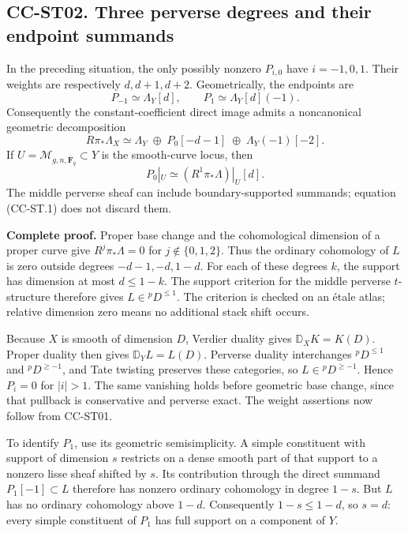 \subsection{CC-ST02. Three perverse degrees and their endpoint
summands}\label{cc-st02.-three-perverse-degrees-and-their-endpoint-summands}

In the preceding situation, the only possibly nonzero \(P_{i,0}\) have
\(i=-1,0,1\). Their weights are respectively \(d,d+1,d+2\).
Geometrically, the endpoints are \[
P_{-1}\simeq\Lambda_Y[d],\qquad
P_1\simeq\Lambda_Y[d](-1).
\] Consequently the constant-coefficient direct image admits a
noncanonical geometric decomposition \[
R\pi_*\Lambda_X\simeq
\Lambda_Y\;\oplus\;P_0[-d-1]\;\oplus\;\Lambda_Y(-1)[-2].
\tag{CC-ST.1}
\] If \(U=\mathcal M_{g,n,\overline{\mathbf F}_q}\subset Y\) is the
smooth-curve locus, then \[
P_0|_U\simeq (R^1\pi_*\Lambda)|_U[d].
\] The middle perverse sheaf can include boundary-supported summands;
equation (CC-ST.1) does not discard them.

\textbf{Complete proof.} Proper base change and the cohomological
dimension of a proper curve give \(R^j\pi_*\Lambda=0\) for
\(j\notin\{0,1,2\}\). Thus the ordinary cohomology of \(L\) is zero
outside degrees \(-d-1,-d,1-d\). For each of these degrees \(k\), the
support has dimension at most \(d\leq1-k\). The support criterion for
the middle perverse \(t\)-structure therefore gives
\(L\in{}^pD^{\leq1}\). The criterion is checked on an étale atlas;
relative dimension zero means no additional stack shift occurs.

Because \(X\) is smooth of dimension \(D\), Verdier duality gives
\(\mathbb D_XK=K(D)\). Proper duality then gives \(\mathbb D_YL=L(D)\).
Perverse duality interchanges \({}^pD^{\leq1}\) and \({}^pD^{\geq-1}\),
and Tate twisting preserves these categories, so \(L\in{}^pD^{\geq-1}\).
Hence \(P_i=0\) for \(|i|>1\). The same vanishing holds before geometric
base change, since that pullback is conservative and perverse exact. The
weight assertions now follow from CC-ST01.

To identify \(P_1\), use its geometric semisimplicity. A simple
constituent with support of dimension \(s\) restricts on a dense smooth
part of that support to a nonzero lisse sheaf shifted by \(s\). Its
contribution through the direct summand \(P_1[-1]\subset L\) therefore
has nonzero ordinary cohomology in degree \(1-s\). But \(L\) has no
ordinary cohomology above \(1-d\). Consequently \(1-s\leq1-d\), so
\(s=d\): every simple constituent of \(P_1\) has full support on a
component of \(Y\).

